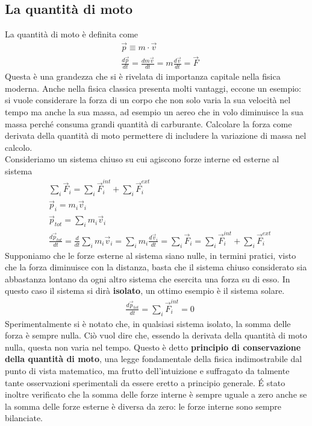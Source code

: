 \documentclass[10pt,a4paper]{article}
\begin{document}
\subsection{La quantità di moto}
La quantità di moto è definita come
\begin{align*}
&\vec{p} \equiv m \cdot \vec{v}\\
&\frac{d\vec{p}}{dt} = \frac{d m\vec{v}}{dt} = m\frac{d\vec{v}}{dt}= \vec{F}
\end{align*}
Questa è una grandezza che si è rivelata di importanza capitale nella fisica moderna. Anche nella fisica classica presenta molti vantaggi, eccone un esempio: si vuole considerare la forza di un corpo che non solo varia la sua velocità nel tempo ma anche la sua massa, ad esempio un aereo che in volo diminuisce la sua massa perché consuma grandi quantità di carburante. Calcolare la forza come derivata della quantità di moto permettere di includere la variazione di massa nel calcolo.\\
Consideriamo un sistema chiuso su cui agiscono forze interne ed esterne al sistema
\begin{align*}
&\sum_{i}\vec{F}_i= \sum_{i}\vec{F}_i^{int}+ \sum_{i}\vec{F}_i^{ext}\\
&\vec{p}_i=m_i\vec{v}_i\\
&\vec{p}_{tot}=\sum_{i}m_i\vec{v}_i\\
&\frac{d\vec{p}_{tot}}{dt}=\frac{d}{dt}\sum_{i}m_i\vec{v}_i=\sum_{i}m_i\frac{d\vec{v}_i}{dt}=\sum_{i}\vec{F}_i= \sum_{i}\vec{F}_i^{int}+ \sum_{i}\vec{F}_i^{ext}
\end{align*}
Supponiamo che le forze esterne al sistema siano nulle, in termini pratici, visto che la forza diminuisce con la distanza, basta che il sistema chiuso considerato sia abbastanza lontano da ogni altro sistema che esercita una forza su di esso. In questo caso il sistema si dirà \textbf{isolato}, un ottimo esempio è il sistema solare.
\begin{align*}
	&\frac{d\vec{p}_{tot}}{dt}=\sum_{i}\vec{F}_i^{int}= 0
\end{align*}
Sperimentalmente si è notato che, in qualsiasi sistema isolato, la somma delle forza è sempre nulla. Ciò vuol dire che,
essendo la derivata della quantità di moto nulla, questa non varia nel tempo. Questo è detto \textbf{principio di conservazione della quantità di moto}, una legge fondamentale della fisica indimostrabile dal punto di vista matematico, ma frutto dell'intuizione e suffragato da talmente tante osservazioni sperimentali da essere eretto a principio generale. \'{E} stato inoltre verificato che la somma delle forze interne è sempre uguale a zero anche se la somma delle forze esterne è diversa da zero: le forze interne sono sempre bilanciate.  
\end{document}
